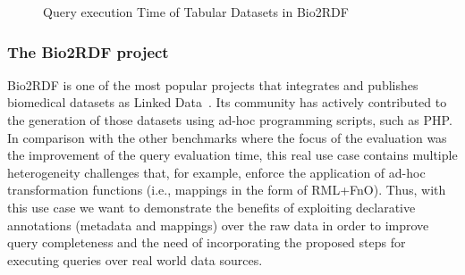 \begin{figure}[!ht]
    \centering
    \caption[Query execution Time of Tabular Datasets in Bio2RDF]{Query execution Time of Tabular Datasets in Bio2RDF}
\end{figure}


\subsubsection{The Bio2RDF project}
Bio2RDF is one of the most popular projects that integrates and publishes biomedical datasets as Linked Data~\citep{belleau2008bio2rdf}. Its community has actively contributed to the generation of those datasets using ad-hoc programming scripts, such as PHP. In comparison with the other benchmarks where the focus of the evaluation was the improvement of the query evaluation time, this real use case contains multiple heterogeneity challenges that, for example, enforce the application of ad-hoc transformation functions (i.e., mappings in the form of RML+FnO). Thus, with this use case we want to demonstrate the benefits of exploiting declarative annotations (metadata and mappings) over the raw data in order to improve query completeness and the need of incorporating the proposed steps for executing queries over real world data sources.

